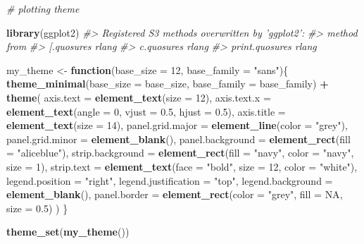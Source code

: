 \documentclass[]{book}
\newenvironment{Shaded}{\begin{snugshade}}{\end{snugshade}}
\newcommand{\CommentTok}[1]{\textcolor[rgb]{0.56,0.35,0.01}{\textit{#1}}}
\newcommand{\ControlFlowTok}[1]{\textcolor[rgb]{0.13,0.29,0.53}{\textbf{#1}}}
\newcommand{\DataTypeTok}[1]{\textcolor[rgb]{0.13,0.29,0.53}{#1}}
\newcommand{\DecValTok}[1]{\textcolor[rgb]{0.00,0.00,0.81}{#1}}
\newcommand{\FloatTok}[1]{\textcolor[rgb]{0.00,0.00,0.81}{#1}}
\newcommand{\KeywordTok}[1]{\textcolor[rgb]{0.13,0.29,0.53}{\textbf{#1}}}
\newcommand{\NormalTok}[1]{#1}
\newcommand{\OperatorTok}[1]{\textcolor[rgb]{0.81,0.36,0.00}{\textbf{#1}}}
\newcommand{\OtherTok}[1]{\textcolor[rgb]{0.56,0.35,0.01}{#1}}
\newcommand{\StringTok}[1]{\textcolor[rgb]{0.31,0.60,0.02}{#1}}
\begin{document}
\begin{Shaded}
\begin{Highlighting}[]
\CommentTok{# plotting theme}

\KeywordTok{library}\NormalTok{(ggplot2)}
\CommentTok{#> Registered S3 methods overwritten by 'ggplot2':}
\CommentTok{#>   method         from }
\CommentTok{#>   [.quosures     rlang}
\CommentTok{#>   c.quosures     rlang}
\CommentTok{#>   print.quosures rlang}

\NormalTok{my_theme <-}\StringTok{ }\ControlFlowTok{function}\NormalTok{(}\DataTypeTok{base_size =} \DecValTok{12}\NormalTok{, }\DataTypeTok{base_family =} \StringTok{"sans"}\NormalTok{)\{}
  \KeywordTok{theme_minimal}\NormalTok{(}\DataTypeTok{base_size =}\NormalTok{ base_size, }\DataTypeTok{base_family =}\NormalTok{ base_family) }\OperatorTok{+}
\StringTok{  }\KeywordTok{theme}\NormalTok{(}
    \DataTypeTok{axis.text =} \KeywordTok{element_text}\NormalTok{(}\DataTypeTok{size =} \DecValTok{12}\NormalTok{),}
    \DataTypeTok{axis.text.x =} \KeywordTok{element_text}\NormalTok{(}\DataTypeTok{angle =} \DecValTok{0}\NormalTok{, }\DataTypeTok{vjust =} \FloatTok{0.5}\NormalTok{, }\DataTypeTok{hjust =} \FloatTok{0.5}\NormalTok{),}
    \DataTypeTok{axis.title =} \KeywordTok{element_text}\NormalTok{(}\DataTypeTok{size =} \DecValTok{14}\NormalTok{),}
    \DataTypeTok{panel.grid.major =} \KeywordTok{element_line}\NormalTok{(}\DataTypeTok{color =} \StringTok{"grey"}\NormalTok{),}
    \DataTypeTok{panel.grid.minor =} \KeywordTok{element_blank}\NormalTok{(),}
    \DataTypeTok{panel.background =} \KeywordTok{element_rect}\NormalTok{(}\DataTypeTok{fill =} \StringTok{"aliceblue"}\NormalTok{),}
    \DataTypeTok{strip.background =} \KeywordTok{element_rect}\NormalTok{(}\DataTypeTok{fill =} \StringTok{"navy"}\NormalTok{, }\DataTypeTok{color =} \StringTok{"navy"}\NormalTok{, }\DataTypeTok{size =} \DecValTok{1}\NormalTok{),}
    \DataTypeTok{strip.text =} \KeywordTok{element_text}\NormalTok{(}\DataTypeTok{face =} \StringTok{"bold"}\NormalTok{, }\DataTypeTok{size =} \DecValTok{12}\NormalTok{, }\DataTypeTok{color =} \StringTok{"white"}\NormalTok{),}
    \DataTypeTok{legend.position =} \StringTok{"right"}\NormalTok{,}
    \DataTypeTok{legend.justification =} \StringTok{"top"}\NormalTok{, }
    \DataTypeTok{legend.background =} \KeywordTok{element_blank}\NormalTok{(),}
    \DataTypeTok{panel.border =} \KeywordTok{element_rect}\NormalTok{(}\DataTypeTok{color =} \StringTok{"grey"}\NormalTok{, }\DataTypeTok{fill =} \OtherTok{NA}\NormalTok{, }\DataTypeTok{size =} \FloatTok{0.5}\NormalTok{)}
\NormalTok{  )}
\NormalTok{\}}

\KeywordTok{theme_set}\NormalTok{(}\KeywordTok{my_theme}\NormalTok{())}
\end{Highlighting}
\end{Shaded}
\end{document}
